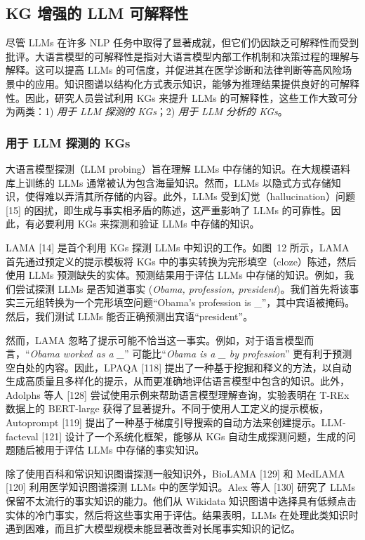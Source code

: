 \documentclass[11pt,UTF8,fontset=fandol]{ctexart}
\begin{document}
\subsection{KG 增强的 LLM 可解释性}

尽管 LLMs 在许多 NLP 任务中取得了显著成就，但它们仍因缺乏可解释性而受到批评。大语言模型的可解释性是指对大语言模型内部工作机制和决策过程的理解与解释。这可以提高 LLMs 的可信度，并促进其在医学诊断和法律判断等高风险场景中的应用。知识图谱以结构化方式表示知识，能够为推理结果提供良好的可解释性。因此，研究人员尝试利用 KGs 来提升 LLMs 的可解释性，这些工作大致可分为两类：1) \emph{用于 LLM 探测的 KGs}；2) \emph{用于 LLM 分析的 KGs}。

\subsubsection{用于 LLM 探测的 KGs}

大语言模型探测（LLM probing）旨在理解 LLMs 中存储的知识。在大规模语料库上训练的 LLMs 通常被认为包含海量知识。然而，LLMs 以隐式方式存储知识，使得难以弄清其所存储的内容。此外，LLMs 受到幻觉（hallucination）问题 [15] 的困扰，即生成与事实相矛盾的陈述，这严重影响了 LLMs 的可靠性。因此，有必要利用 KGs 来探测和验证 LLMs 中存储的知识。

LAMA [14] 是首个利用 KGs 探测 LLMs 中知识的工作。如图~12 所示，LAMA 首先通过预定义的提示模板将 KGs 中的事实转换为完形填空（cloze）陈述，然后使用 LLMs 预测缺失的实体。预测结果用于评估 LLMs 中存储的知识。例如，我们尝试探测 LLMs 是否知道事实 (\emph{Obama, profession, president})。我们首先将该事实三元组转换为一个完形填空问题``Obama's profession is \_''，其中宾语被掩码。然后，我们测试 LLMs 能否正确预测出宾语``president''。

然而，LAMA 忽略了提示可能不恰当这一事实。例如，对于语言模型而言，``\emph{Obama worked as a \_}'' 可能比``\emph{Obama is a \_ by profession}'' 更有利于预测空白处的内容。因此，LPAQA [118] 提出了一种基于挖掘和释义的方法，以自动生成高质量且多样化的提示，从而更准确地评估语言模型中包含的知识。此外，Adolphs 等人 [128] 尝试使用示例来帮助语言模型理解查询，实验表明在 T-REx 数据上的 BERT-large 获得了显著提升。不同于使用人工定义的提示模板，Autoprompt [119] 提出了一种基于梯度引导搜索的自动方法来创建提示。LLM-facteval [121] 设计了一个系统化框架，能够从 KGs 自动生成探测问题，生成的问题随后被用于评估 LLMs 中存储的事实知识。

除了使用百科和常识知识图谱探测一般知识外，BioLAMA [129] 和 MedLAMA [120] 利用医学知识图谱探测 LLMs 中的医学知识。Alex 等人 [130] 研究了 LLMs 保留不太流行的事实知识的能力。他们从 Wikidata 知识图谱中选择具有低频点击实体的冷门事实，然后将这些事实用于评估。结果表明，LLMs 在处理此类知识时遇到困难，而且扩大模型规模未能显著改善对长尾事实知识的记忆。
\end{document}
